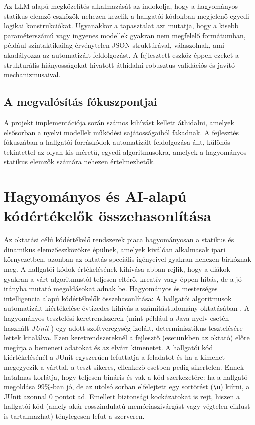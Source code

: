 \documentclass[12pt,a4paper]{article}
\begin{document}
Az LLM-alapú megközelítés alkalmazását az indokolja, hogy a hagyományos statikus elemző eszközök nehezen kezelik a hallgatói kódokban megjelenő egyedi logikai konstrukciókat. Ugyanakkor a tapasztalat azt mutatja, hogy a kisebb paraméterszámú vagy ingyenes modellek gyakran nem megfelelő formátumban, például szintaktikailag érvénytelen JSON-struktúrával, válaszolnak, ami akadályozza az automatizált feldolgozást. A fejlesztett eszköz éppen ezeket a strukturális hiányosságokat hivatott áthidalni robusztus validációs és javító mechanizmusaival.

\subsection{A megvalósítás fókuszpontjai}
\label{sec:fokuszpontok}
A projekt implementációja során számos kihívást kellett áthidalni, amelyek elsősorban a nyelvi modellek működési sajátosságaiból fakadnak. A fejlesztés fókuszában a hallgatói forráskódok automatizált feldolgozása állt, különös tekintettel az olyan kis méretű, egyedi algoritmusokra, amelyek a hagyományos statikus elemzők számára nehezen értelmezhetők.

\section{Hagyományos és AI-alapú kódértékelők összehasonlítása}
\label{sec:hagyomanyos_vs_ai}
Az oktatási célú kódértékelő rendszerek piaca hagyományosan a statikus és dinamikus elemzőeszközökre épülnek, amelyek kiválóan alkalmasak ipari környezetben, azonban az oktatás speciális igényeivel gyakran nehezen birkóznak meg. A hallgatói kódok értékelésének kihívása abban rejlik, hogy a diákok gyakran a várt algoritmustól teljesen eltérő, kreatív vagy éppen hibás, de a jó irányba mutató megoldásokat adnak be. Hagyományos és mesterséges intelligencia alapú kódértékelők összehasonlítása: A hallgatói algoritmusok automatizált kiértékelése évtizedes kihívás a számítástudomány oktatásában \cite{ihantola2010review}. A hagyományos tesztelési keretrendszerek (mint például a Java nyelv esetén használt \textit{JUnit} \cite{junit}) egy adott szoftveregység izolált, determinisztikus tesztelésére lettek kitalálva. Ezen keretrendszereknél a fejlesztő (esetünkben az oktató) előre megírja a bemeneti adatokat és az elvárt kimenetet. A hallgatói kód kiértékelésénél a JUnit egyszerűen lefuttatja a feladatot és ha a kimenet megegyezik a várttal, a teszt sikeres, ellenkező esetben pedig sikertelen. Ennek hatalmas korlátja, hogy teljesen bináris és vak a kód szerkezetére: ha a hallgató megoldása 99\%-ban jó, de az utolsó sorban elfelejtett egy sortörést (\texttt{\textbackslash n}) kiírni, a JUnit azonnal 0 pontot ad. Emellett biztonsági kockázatokat is rejt, hiszen a hallgatói kód (amely akár rosszindulatú memóriaszivárgást vagy végtelen ciklust is tartalmazhat) ténylegesen lefut a szerveren.
\end{document}

